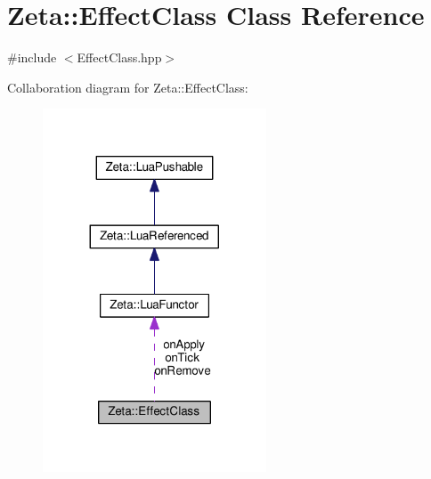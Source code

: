 \hypertarget{classZeta_1_1EffectClass}{\section{Zeta\+:\+:Effect\+Class Class Reference}
\label{classZeta_1_1EffectClass}
}


{\ttfamily \#include $<$Effect\+Class.\+hpp$>$}



Collaboration diagram for Zeta\+:\+:Effect\+Class\+:\nopagebreak
\begin{figure}[H]
\begin{center}
\leavevmode
\includegraphics[width=188pt]{classZeta_1_1EffectClass__coll__graph}
\end{center}
\end{figure}
